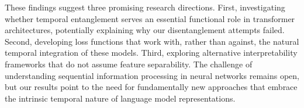 \documentclass{article} %
\begin{document}
These findings suggest three promising research directions. First, investigating whether temporal entanglement serves an essential functional role in transformer architectures, potentially explaining why our disentanglement attempts failed. Second, developing loss functions that work with, rather than against, the natural temporal integration of these models. Third, exploring alternative interpretability frameworks that do not assume feature separability. The challenge of understanding sequential information processing in neural networks remains open, but our results point to the need for fundamentally new approaches that embrace the intrinsic temporal nature of language model representations.



\end{document}
